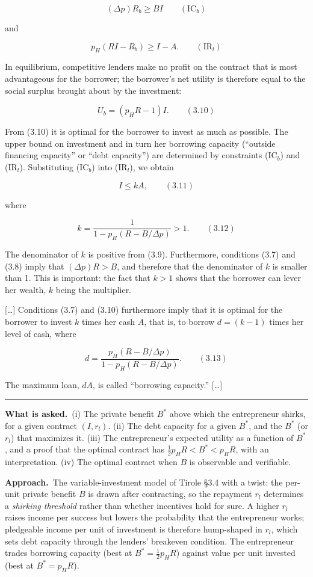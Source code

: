 \documentclass[11pt,a4paper]{article}
\newcommand{\asked}{\par\medskip\noindent\textbf{What is asked.}~}
\newcommand{\approach}{\par\smallskip\noindent\textbf{Approach.}~}
\newcommand{\stmtend}{\par\endgroup\nopagebreak\noindent\rule{\linewidth}{0.4pt}\par\medskip}
\begin{document}
\[(\Delta p) R_b \geqslant BI \qquad (\text{IC}_b)\]

and

\[p_H(RI - R_b) \geqslant I - A. \qquad (\text{IR}_l)\]

In equilibrium, competitive lenders make no profit on the contract that is most advantageous for the
borrower; the borrower's net utility is therefore equal to the social surplus brought about by the
investment:

\[U_b = (p_H R - 1) I. \qquad (3.10)\]

From (3.10) it is optimal for the borrower to invest as much as possible. The upper bound on
investment and in turn her borrowing capacity (``outside financing capacity'' or ``debt capacity'')
are determined by constraints (IC\(_b\)) and (IR\(_l\)). Substituting (IC\(_b\)) into (IR\(_l\)), we
obtain

\[I \leqslant kA, \qquad (3.11)\]

where

\[k = \frac{1}{1 - p_H(R - B/\Delta p)} > 1. \qquad (3.12)\]

The denominator of \(k\) is positive from (3.9). Furthermore, conditions (3.7) and (3.8) imply that
\((\Delta p)R > B\), and therefore that the denominator of \(k\) is smaller than 1. This is
important: the fact that \(k > 1\) shows that the borrower can lever her wealth, \(k\) being the
multiplier.

{[}\ldots{]} Conditions (3.7) and (3.10) furthermore imply that it is optimal for the borrower to
invest \(k\) times her cash \(A\), that is, to borrow \(d = (k - 1)\) times her level of cash, where

\[d = \frac{p_H(R - B/\Delta p)}{1 - p_H(R - B/\Delta p)}. \qquad (3.13)\]

The maximum loan, \(dA\), is called ``borrowing capacity.'' {[}\ldots{]}
\stmtend

\asked (i) The private benefit $B^*$ above which the entrepreneur shirks, for a given contract $(I,r_l)$. (ii) The debt capacity for a given $B^*$, and the $B^*$ (or $r_l$) that maximizes it. (iii) The entrepreneur's expected utility as a function of $B^*$, and a proof that the optimal contract has $\tfrac12p_HR<B^*<p_HR$, with an interpretation. (iv) The optimal contract when $B$ is observable and verifiable.

\approach The variable-investment model of Tirole \S3.4 with a twist: the per-unit private benefit $B$ is drawn after contracting, so the repayment $r_l$ determines a \emph{shirking threshold} rather than whether incentives hold for sure. A higher $r_l$ raises income per success but lowers the probability that the entrepreneur works; pledgeable income per unit of investment is therefore hump-shaped in $r_l$, which sets debt capacity through the lenders' breakeven condition. The entrepreneur trades borrowing capacity (best at $B^*=\tfrac12p_HR$) against value per unit invested (best at $B^*=p_HR$).
\end{document}
